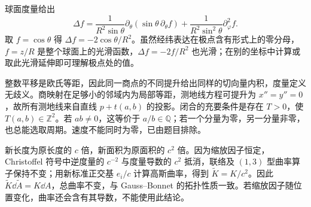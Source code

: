\begin{solve}
球面度量给出
\[
 \Delta f=\frac1{R^2\sin\theta}\partial_\theta(\sin\theta\,\partial_\theta f)
 +\frac1{R^2\sin^2\theta}\partial_\varphi^2f.
\]
取 $f=\cos\theta$ 得 $\Delta f=-2\cos\theta/R^2$。虽然经纬表达在极点含有形式上的零分母，$f=z/R$ 是整个球面上的光滑函数，$\Delta f=-2f/R^2$ 也光滑；在别的坐标中计算或取此光滑延伸即可理解极点处的值。
\end{solve}

\begin{solve}
整数平移是欧氏等距，因此同一商点的不同提升给出同样的切向量内积，度量定义无歧义。商映射在足够小的邻域内为局部等距，测地线方程可提升为 $x''=y''=0$，故所有测地线来自直线 $p+t(a,b)$ 的投影。闭合的充要条件是存在 $T>0$，使 $T(a,b)\in\mathbb Z^2$。若 $ab\ne0$，这等价于 $a/b\in\mathbb Q$；若一个分量为零，另一分量非零，也总能选取周期。速度不能同时为零，已由题目排除。
\end{solve}

\begin{solve}
新长度为原长度的 $c$ 倍，新面积为原面积的 $c^2$ 倍。因为缩放因子恒定，Christoffel 符号中逆度量的 $c^{-2}$ 与度量导数的 $c^2$ 抵消，联络及 $(1,3)$ 型曲率算子保持不变；用新标准正交基 $e_i/c$ 计算高斯曲率，得到 $\widetilde K=K/c^2$。因此 $\widetilde K\dd\widetilde A=K\dd A$，总曲率不变，与 Gauss--Bonnet 的拓扑性质一致。若缩放因子随位置变化，曲率还会含有其导数，不能使用此结论。
\end{solve}

